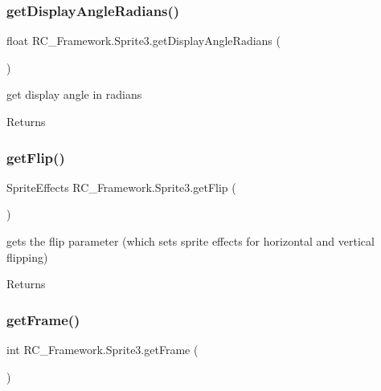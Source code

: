 \subsubsection{\texorpdfstring{get\+Display\+Angle\+Radians()}{getDisplayAngleRadians()}}
{\footnotesize\ttfamily float R\+C\+\_\+\+Framework.\+Sprite3.\+get\+Display\+Angle\+Radians (\begin{DoxyParamCaption}{ }\end{DoxyParamCaption})}



get display angle in radians 

\begin{DoxyReturn}{Returns}

\end{DoxyReturn}
\mbox{\label{class_r_c___framework_1_1_sprite3_af559b399e3825aedda707573275f64df}} 
\subsubsection{\texorpdfstring{get\+Flip()}{getFlip()}}
{\footnotesize\ttfamily Sprite\+Effects R\+C\+\_\+\+Framework.\+Sprite3.\+get\+Flip (\begin{DoxyParamCaption}{ }\end{DoxyParamCaption})}



gets the flip parameter (which sets sprite effects for horizontal and vertical flipping) 

\begin{DoxyReturn}{Returns}

\end{DoxyReturn}
\mbox{\label{class_r_c___framework_1_1_sprite3_a4c0a6cf29709e9c6f8ead39eea215f4b}} 
\subsubsection{\texorpdfstring{get\+Frame()}{getFrame()}}
{\footnotesize\ttfamily int R\+C\+\_\+\+Framework.\+Sprite3.\+get\+Frame (\begin{DoxyParamCaption}{ }\end{DoxyParamCaption})}



